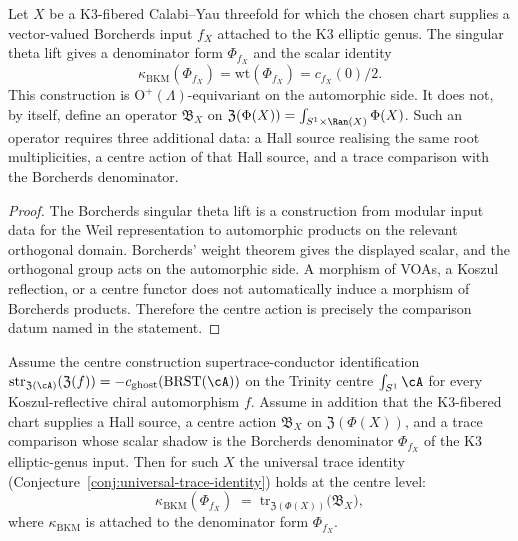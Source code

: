\begin{proposition}
\label{prop:borcherds-character-lift}
Let \(X\) be a K$3$-fibered Calabi--Yau threefold for which the chosen
chart supplies a vector-valued Borcherds input \(f_X\) attached to the
K$3$ elliptic genus.  The singular theta lift gives a denominator form
\(\Phi_{f_X}\) and the scalar identity
\[
 \kappa_{\mathrm{BKM}}(\Phi_{f_X})
 =
 \mathrm{wt}(\Phi_{f_X})
 =
 c_{f_X}(0)/2.
\]
This construction is \(\mathrm O^+(\Lambda)\)-equivariant on the
automorphic side.  It does not, by itself, define an operator
\(\mathfrak B_X\) on
\(\mathfrak Z(\Phi(X))=\int_{S^1\times\Ran(X)}\Phi(X)\).  Such an
operator requires three additional data: a Hall source realising the
same root multiplicities, a centre action of that Hall source, and a
trace comparison with the Borcherds denominator.
\end{proposition}

\begin{proof}
The Borcherds singular theta lift is a construction from modular input
data for the Weil representation to automorphic products on the relevant
orthogonal domain.  Borcherds' weight theorem gives the displayed
scalar, and the orthogonal group acts on the automorphic side.  A
morphism of VOAs, a Koszul reflection, or a centre functor does not
automatically induce a morphism of Borcherds products.  Therefore the
centre action is precisely the comparison datum named in the statement.
\end{proof}

\begin{theorem}
\label{thm:universal-trace-identity-k3-fibered}
Assume the centre construction supertrace-conductor identification
$\mathrm{str}_{\mathfrak{Z}(\cA)}(\mathfrak{Z}(f)) = -c_{\mathrm{ghost}}(\mathrm{BRST}(\cA))$
on the Trinity centre $\int_{S^1}\cA$ for every Koszul-reflective
chiral automorphism \(f\).  Assume in addition that the K$3$-fibered
chart supplies a Hall source, a centre action \(\mathfrak B_X\) on
\(\mathfrak Z(\Phi(X))\), and a trace comparison whose scalar shadow is
the Borcherds denominator \(\Phi_{f_X}\) of the K$3$ elliptic-genus
input. Then for such \(X\) the universal trace identity
\textup{(}Conjecture~\ref{conj:universal-trace-identity}\textup{)}
holds at the centre level:
\[
 \kappa_{\mathrm{BKM}}(\Phi_{f_X})
 \;=\;
 \mathrm{tr}_{\mathfrak{Z}(\Phi(X))}\bigl(\mathfrak{B}_X\bigr),
\]
where \(\kappa_{\mathrm{BKM}}\) is attached to the denominator form
\(\Phi_{f_X}\).
\end{theorem}


